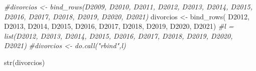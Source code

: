 \documentclass[
]{article}
\newenvironment{Shaded}{\begin{snugshade}}{\end{snugshade}}
\newcommand{\CommentTok}[1]{\textcolor[rgb]{0.56,0.35,0.01}{\textit{#1}}}
\newcommand{\FunctionTok}[1]{\textcolor[rgb]{0.00,0.00,0.00}{#1}}
\newcommand{\NormalTok}[1]{#1}
\newcommand{\OtherTok}[1]{\textcolor[rgb]{0.56,0.35,0.01}{#1}}
\begin{document}
\begin{Shaded}
\begin{Highlighting}[]
\CommentTok{\#divorcios \textless{}{-} bind\_rows(D2009, D2010, D2011, D2012, D2013, D2014, D2015, D2016, D2017, D2018, D2019, D2020, D2021)}
\NormalTok{divorcios }\OtherTok{\textless{}{-}} \FunctionTok{bind\_rows}\NormalTok{( D2012, D2013, D2014, D2015, D2016, D2017, D2018, D2019, D2020, D2021)}
\CommentTok{\#l = list(D2012, D2013, D2014, D2015, D2016, D2017, D2018, D2019, D2020, D2021)}
\CommentTok{\#divorcios \textless{}{-} do.call("rbind",l)}
\end{Highlighting}
\end{Shaded}

\begin{Shaded}
\begin{Highlighting}[]
\FunctionTok{str}\NormalTok{(divorcios)}
\end{Highlighting}
\end{Shaded}
\end{document}
